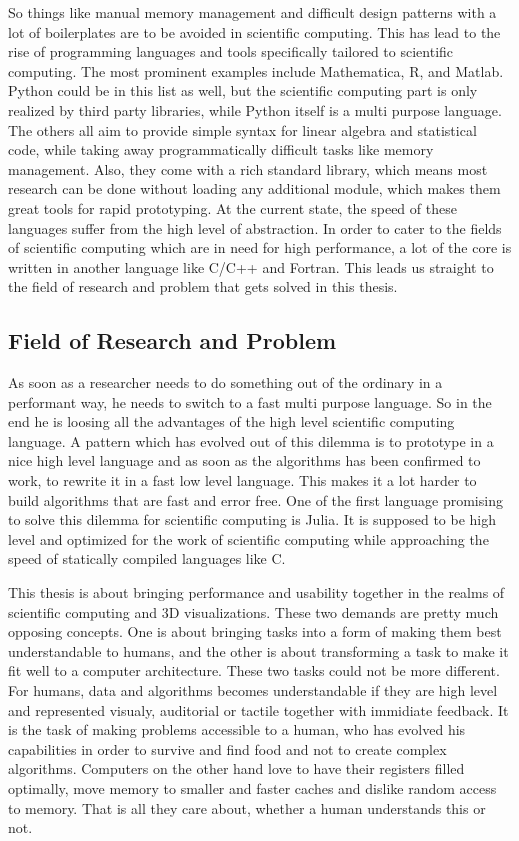 So things like manual memory management and difficult design patterns with a lot of boilerplates are to be avoided in scientific computing.
This has lead to the rise of programming languages and tools specifically tailored to scientific computing.
The most prominent examples include Mathematica, R, and Matlab. Python could be in this list as well, but the scientific computing part is only realized by third party libraries, while Python itself is a multi purpose language.
The others all aim to provide simple syntax for linear algebra and statistical code, while taking away programmatically difficult tasks like memory management. 
Also, they come with a rich standard library, which means most research can be done without loading any additional module, which makes them great tools for rapid prototyping.
At the current state, the speed of these languages suffer from the high level of abstraction. 
In order to cater to the fields of scientific computing which are in need for high performance, a lot of the core is written in another language like C/C++ and Fortran. 
This leads us straight to the field of research and problem that gets solved in this thesis.



\subsection{Field of Research and Problem}


As soon as a researcher needs to do something out of the ordinary in a performant way, he needs to switch to a fast multi purpose language. So in the end he is loosing all the advantages of the high level scientific computing language.
A pattern which has evolved out of this dilemma is to prototype in a nice high level language and as soon as the algorithms has been confirmed to work, to rewrite it in a fast low level language. 
This makes it a lot harder to build algorithms that are fast and error free.
One of the first language promising to solve this dilemma for scientific computing is Julia. 
It is supposed to be high level and optimized for the work of scientific computing while approaching the speed of statically compiled languages like C.

This thesis is about bringing performance and usability together in the realms of scientific computing and 3D visualizations.
These two demands are pretty much opposing concepts. 
One is about bringing tasks into a form of making them best understandable to humans, and the other is about transforming a task to make it fit well to a computer architecture.
These two tasks could not be more different. For humans, data and algorithms becomes understandable if they are high level and represented visualy, auditorial or tactile together with immidiate feedback. 
It is the task of making problems accessible to a human, who has evolved his capabilities in order to survive and find food and not to create complex algorithms.
Computers on the other hand love to have their registers filled optimally, move memory to smaller and faster caches and dislike random access to memory. That is all they care about, whether a human understands this or not.


